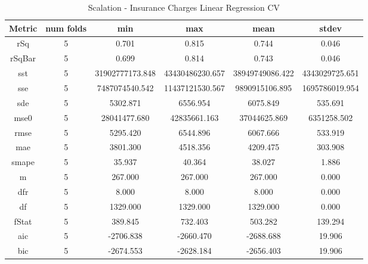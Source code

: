 \documentclass{article}
\begin{document}
\begin{table}[H]
\centering
\caption{Scalation - Insurance Charges Linear Regression CV}
\label{tab:Scalation - Insurance Charges Linear Regression CV}
\begin{tabular}{|c|c|c|c|c|c|}\hline
Metric & num folds & min & max & mean & stdev \\ \hline \hline
rSq & 5 & 0.701 & 0.815 & 0.744 & 0.046 \\ \hline
rSqBar & 5 & 0.699 & 0.814 & 0.743 & 0.046 \\ \hline
sst & 5 & 31902777173.848 & 43430486230.657 & 38949749086.422 & 4343029725.651 \\ \hline
sse & 5 & 7487074540.542 & 11437121530.567 & 9890915106.895 & 1695786019.954 \\ \hline
sde & 5 & 5302.871 & 6556.954 & 6075.849 & 535.691 \\ \hline
mse0 & 5 & 28041477.680 & 42835661.163 & 37044625.869 & 6351258.502 \\ \hline
rmse & 5 & 5295.420 & 6544.896 & 6067.666 & 533.919 \\ \hline
mae & 5 & 3801.300 & 4518.356 & 4209.475 & 303.908 \\ \hline
smape & 5 & 35.937 & 40.364 & 38.027 & 1.886 \\ \hline
m & 5 & 267.000 & 267.000 & 267.000 & 0.000 \\ \hline
dfr & 5 & 8.000 & 8.000 & 8.000 & 0.000 \\ \hline
df & 5 & 1329.000 & 1329.000 & 1329.000 & 0.000 \\ \hline
fStat & 5 & 389.845 & 732.403 & 503.282 & 139.294 \\ \hline
aic & 5 & -2706.838 & -2660.470 & -2688.688 & 19.906 \\ \hline
bic & 5 & -2674.553 & -2628.184 & -2656.403 & 19.906 \\ \hline
\end{tabular}
\end{table}
\end{document}
